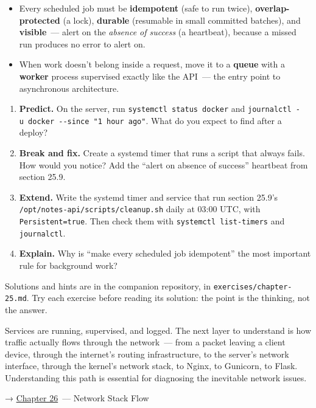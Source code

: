 \begin{takeaways}
\begin{itemize}
\item
  Every scheduled job must be \textbf{idempotent} (safe to run twice), \textbf{overlap-protected} (a lock), \textbf{durable} (resumable in small committed batches), and \textbf{visible}~--- alert on the \emph{absence of success} (a heartbeat), because a missed run produces no error to alert on.
\item
  When work doesn't belong inside a request, move it to a \textbf{queue} with a \textbf{worker} process supervised exactly like the API~--- the entry point to asynchronous architecture.
\end{itemize}

\end{takeaways}

\label{25-process-management:exercises}

\begin{enumerate}
\def\labelenumi{\arabic{enumi}.}
\tightlist
\item
  \textbf{Predict.} On the server, run \texttt{systemctl\ status\ docker} and \texttt{journalctl\ -}\allowbreak{}\texttt{u\ docker\ -}\allowbreak{}\texttt{-}\allowbreak{}\texttt{since\ "1\ hour\ ago"}. What do you expect to find after a deploy?
\item
  \textbf{Break and fix.} Create a systemd timer that runs a script that always fails. How would you notice? Add the ``alert on absence of success'' heartbeat from section 25.9.
\item
  \textbf{Extend.} Write the systemd timer and service that run section 25.9's \texttt{/}\allowbreak{}\texttt{opt/}\allowbreak{}\texttt{notes-}\allowbreak{}\texttt{api/}\allowbreak{}\texttt{scripts/}\allowbreak{}\texttt{cleanup.}\allowbreak{}\texttt{sh} daily at 03:00 UTC, with \texttt{Persistent=true}. Then check them with \texttt{systemctl\ list-timers} and \texttt{journalctl}.
\item
  \textbf{Explain.} Why is ``make every scheduled job idempotent'' the most important rule for background work?
\end{enumerate}

\noindent{}Solutions and hints are in the companion repository, in \texttt{exercises/}\allowbreak{}\texttt{chapter-25.md}. Try each exercise before reading its solution: the point is the thinking, not the answer.

\label{25-process-management:whats-next}

Services are running, supervised, and logged. The next layer to understand is how traffic actually flows through the network~--- from a packet leaving a client device, through the internet's routing infrastructure, to the server's network interface, through the kernel's network stack, to Nginx, to Gunicorn, to Flask. Understanding this path is essential for diagnosing the inevitable network issues.

\noindent{}→ \hyperref[ch:26-network-stack-flow]{Chapter 26}~--- Network Stack Flow
